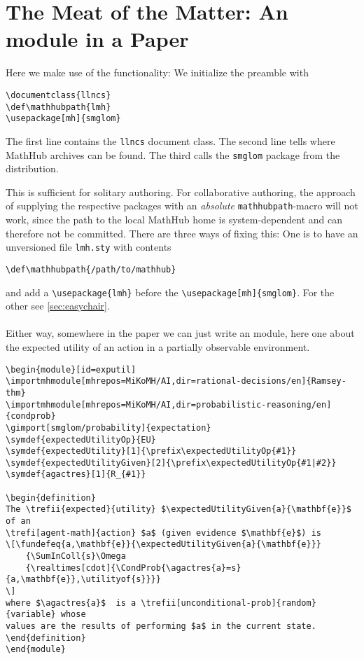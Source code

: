 \documentclass{llncs}
\def\mathhubpath{lmh}
\begin{document}
\section{The Meat of the Matter: An \sTeX module in a Paper}\label{sec:meat}
Here we make use of the \sTeX functionality: We initialize the preamble with
\begin{footnotesize}
\begin{verbatim}
\documentclass{llncs}
\def\mathhubpath{lmh}
\usepackage[mh]{smglom}
\end{verbatim}
  The first line contains the \texttt{llncs} document class. The second line tells \sTeX where MathHub archives can be found. The third calls the
  \texttt{smglom} package from the \sTeX distribution.

  This is sufficient for solitary authoring. For collaborative authoring, the approach of
  supplying the respective \sTeX packages with an \emph{absolute} \texttt{mathhubpath}-macro will not work,
  since the path to the local MathHub home is system-dependent and can therefore not be
  committed. There are three ways of fixing this:  One is to have an unversioned file
  \verb|lmh.sty| with contents
\begin{verbatim}
\def\mathhubpath{/path/to/mathhub} 
\end{verbatim}
  and add a \verb|\usepackage{lmh}| before the \verb|\usepackage[mh]{smglom}|.  For the
  other see \cref{sec:easychair}.

  \paragraph{} Either way, somewhere in the paper we can just write an \sTeX module, here one about the
  expected utility of an action in a partially observable environment.

\begin{verbatim}
\begin{module}[id=exputil]
\importmhmodule[mhrepos=MiKoMH/AI,dir=rational-decisions/en]{Ramsey-thm}
\importmhmodule[mhrepos=MiKoMH/AI,dir=probabilistic-reasoning/en]{condprob}
\gimport[smglom/probability]{expectation}
\symdef{expectedUtilityOp}{EU}
\symdef{expectedUtility}[1]{\prefix\expectedUtilityOp{#1}}
\symdef{expectedUtilityGiven}[2]{\prefix\expectedUtilityOp{#1|#2}}
\symdef{agactres}[1]{R_{#1}}

\begin{definition}
The \trefii{expected}{utility} $\expectedUtilityGiven{a}{\mathbf{e}}$ of an
\trefi[agent-math]{action} $a$ (given evidence $\mathbf{e}$) is
\[\fundefeq{a,\mathbf{e}}{\expectedUtilityGiven{a}{\mathbf{e}}}
    {\SumInColl{s}\Omega
    {\realtimes[cdot]{\CondProb{\agactres{a}=s}{a,\mathbf{e}},\utilityof{s}}}}
\]
where $\agactres{a}$  is a \trefii[unconditional-prob]{random}{variable} whose 
values are the results of performing $a$ in the current state.
\end{definition}
\end{module}
\end{verbatim}
\end{footnotesize}
\end{document}
